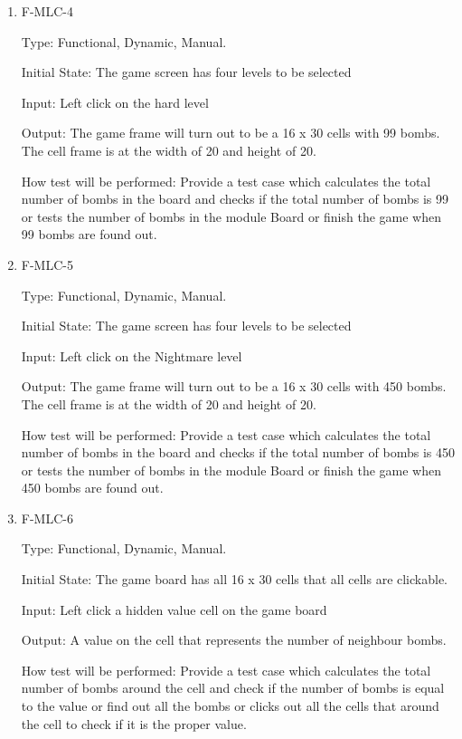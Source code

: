 \documentclass[12pt, titlepage]{article}
\begin{document}
\begin{enumerate}
\item{F-MLC-4\\}

Type: Functional, Dynamic, Manual.
					
Initial State: The game screen has four levels to be selected
					
Input: Left click on the hard level
					
Output: The game frame will turn out to be a 16 x 30 cells with 99 bombs. The cell frame is at the width of 20 and height of 20.
					
How test will be performed: Provide a test case which calculates the total number of bombs in the board and checks if the total number of bombs is 99 or tests the number of bombs in the module Board or finish the game when 99 bombs are found out.

\item{F-MLC-5\\}

Type: Functional, Dynamic, Manual.
					
Initial State: The game screen has four levels to be selected
					
Input: Left click on the Nightmare level
					
Output: The game frame will turn out to be a 16 x 30 cells with 450 bombs. The cell frame is at the width of 20 and height of 20.
					
How test will be performed: Provide a test case which calculates the total number of bombs in the board and checks if the total number of bombs is 450 or tests the number of bombs in the module Board or finish the game when 450 bombs are found out.

\item{F-MLC-6\\}

Type: Functional, Dynamic, Manual.
					
Initial State: The game board has all 16 x 30 cells that all cells are clickable.
					
Input: Left click a hidden value cell on the game board
					
Output: A value on the cell that represents the number of neighbour bombs.
					
How test will be performed: Provide a test case which calculates the total number of bombs around the cell and check if the number of bombs is equal to the value or find out all the bombs or clicks out all the cells that around the cell to check if it is the proper value.


\end{enumerate}
\end{document}
